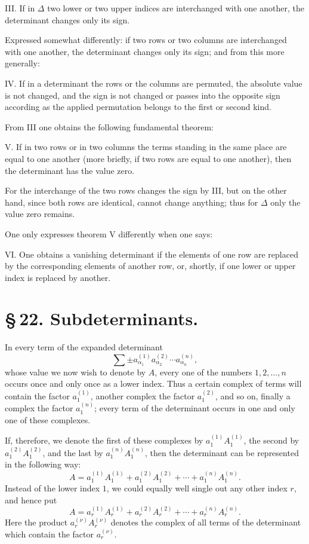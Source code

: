 \documentclass[11pt]{article}
\begin{document}
III. If in \(\Delta\) two lower or two upper indices are interchanged with one another, the determinant changes only its sign.

Expressed somewhat differently: if two rows or two columns are interchanged with one another, the determinant changes only its sign; and from this more generally:

IV. If in a determinant the rows or the columns are permuted, the absolute value is not changed, and the sign is not changed or passes into the opposite sign according as the applied permutation belongs to the first or second kind.

From III one obtains the following fundamental theorem:

V. If in two rows or in two columns the terms standing in the same place are equal to one another (more briefly, if two rows are equal to one another), then the determinant has the value zero.

For the interchange of the two rows changes the sign by III, but on the other hand, since both rows are identical, cannot change anything; thus for \(\Delta\) only the value zero remains.

One only expresses theorem V differently when one says:

VI. One obtains a vanishing determinant if the elements of one row are replaced by the corresponding elements of another row, or, shortly, if one lower or upper index is replaced by another.

\section*{\S\,22. Subdeterminants.}

In every term of the expanded determinant
\[
 \sum \pm a_{\alpha_1}^{(1)}a_{\alpha_2}^{(2)}\cdots a_{\alpha_n}^{(n)},
\]
whose value we now wish to denote by \(A\), every one of the numbers \(1,2,\ldots,n\) occurs once and only once as a lower index. Thus a certain complex of terms will contain the factor \(a_1^{(1)}\), another complex the factor \(a_1^{(2)}\), and so on, finally a complex the factor \(a_1^{(n)}\); every term of the determinant occurs in one and only one of these complexes.

If, therefore, we denote the first of these complexes by \(a_1^{(1)}A_1^{(1)}\), the second by \(a_1^{(2)}A_1^{(2)}\), and the last by \(a_1^{(n)}A_1^{(n)}\), then the determinant can be represented in the following way:
\begin{equation}
 A=a_1^{(1)}A_1^{(1)}+a_1^{(2)}A_1^{(2)}+\cdots+a_1^{(n)}A_1^{(n)}.
\tag{1}
\end{equation}
Instead of the lower index \(1\), we could equally well single out any other index \(r\), and hence put
\begin{equation}
 A=a_r^{(1)}A_r^{(1)}+a_r^{(2)}A_r^{(2)}+\cdots+a_r^{(n)}A_r^{(n)}.
\tag{2}
\end{equation}
Here the product \(a_r^{(\nu)}A_r^{(\nu)}\) denotes the complex of all terms of the determinant which contain the factor \(a_r^{(\nu)}\).
\end{document}
